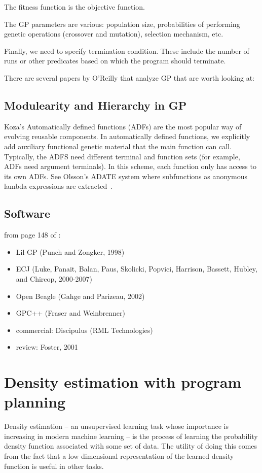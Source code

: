 \documentclass{article}
\begin{document}
The fitness function is the objective function. 

The GP parameters are various: population size, probabilities of performing
genetic operations (crossover and mutation), selection mechanism, etc. 

Finally, we need to specify termination condition. These include the number of
runs or other predicates based on which the program should terminate.

There are several papers by O'Reilly that analyze GP that are worth looking at:
\cite{OReilly:thesis} \cite{OReilly:1995:tabbGP}

\subsection{Modulearity and Hierarchy in GP} 

Koza's Automatically defined functions (ADFs) are the most popular way of
evolving reusable components. In automatically defined functions, we explicitly
add auxiliary functional genetic material that the main function can call.
Typically, the ADFS need different terminal and function sets (for example,
ADFs need argument terminals). In this scheme, each function only has access to
its own ADFs. See Olsson's ADATE system where subfunctions as anonymous lambda
expressions are extracted~\cite{DBLP:conf/eurogp/Olsson9}.

\subsection{Software}
from page 148 of \cite{poli08:fieldguide}:
\begin{itemize}
\item Lil-GP (Punch and Zongker, 1998)
\item ECJ (Luke, Panait, Balan, Paus, Skolicki, Popvici, Harrison, Bassett,
Hubley, and Chircop, 2000-2007)
\item Open Beagle (Gahge and Parizeau, 2002)
\item GPC++ (Fraser and Weinbrenner)
\item commercial: Discipulus (RML Technologies)
\item review: Foster, 2001 
\end{itemize}




\section{Density estimation with program planning} 
Density estimation -- an unsupervised learning task whose importance is
increasing in modern machine learning -- is the process of learning the
probability density function associated with some set of data. The utility of
doing this comes from the fact that a low dimensional representation of the
learned density function is useful in other tasks.
\end{document}
